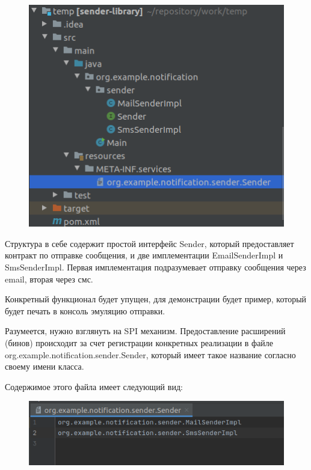 \documentclass[russian,11pt]{article}
\begin{document}
\begin{figure}[H]
	\centering
	\includegraphics[width=\textwidth]{12}
\end{figure}

Структура в себе содержит простой интерфейс Sender, который предоставляет контракт по отправке сообщения, и две имплементации EmailSenderImpl и SmsSenderImpl. Первая имплементация подразумевает отправку сообщения через email, вторая через смс. 

Конкретный функционал будет упущен, для демонстрации будет пример, который будет печать в консоль эмуляцию отправки.

Разумеется, нужно взглянуть на SPI механизм. Предоставление расширений (бинов) происходит за счет регистрации конкретных реализации в файле org.example.notification.sender.Sender, который имеет такое название согласно своему имени класса.

\newpage
Содержимое этого файла имеет следующий вид:

\begin{figure}[H]
	\centering
	\includegraphics[width=\textwidth]{13}
\end{figure}
\end{document}
